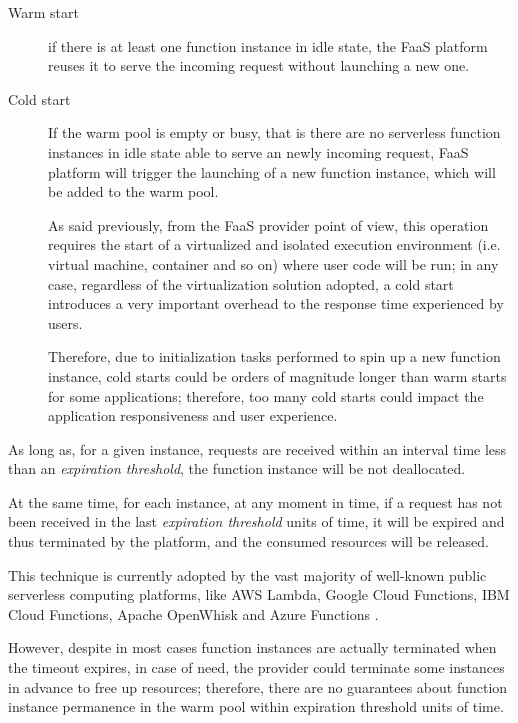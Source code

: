 \documentclass[12pt,a4paper]{report}
\begin{document}
\begin{description}
	
	\item[Warm start] if there is at least one function instance in idle state, the FaaS platform reuses it to serve the incoming request without launching a new one.
	
	\item[Cold start] If the warm pool is empty or busy, that is there are no serverless function instances in idle state able to serve an newly incoming request, FaaS platform will trigger the launching of a new function instance, which will be added to the warm pool.
	
	As said previously, from the FaaS provider point of view, this operation requires the start of a virtualized and isolated execution environment (i.e. virtual machine, container and so on) where user code will be run; in any case, regardless of the virtualization solution adopted, a cold start introduces a very important overhead to the response time experienced by users. 
	
	Therefore, due to initialization tasks performed to spin up a new function instance, cold starts could be orders of magnitude longer than warm starts for some applications; therefore, too many cold starts could impact the application responsiveness and user experience.
\end{description} 

As long as, for a given instance, requests are received within an interval time less than an \textit{expiration threshold}, the function instance will be not deallocated.

At the same time, for each instance, at any moment in time, if a request has not been received in the last \textit{expiration threshold} units of time, it will be expired and thus terminated by the platform, and the consumed resources will be released. 

This technique is currently adopted by the vast majority of well-known public serverless computing platforms, like AWS Lambda, Google Cloud Functions, IBM Cloud Functions, Apache OpenWhisk and Azure Functions \cite{PMSCP}. 

However, despite in most cases function instances are actually terminated when the timeout expires, in case of need, the provider could terminate some instances in advance to free up resources; therefore, there are no guarantees about function instance permanence in the warm pool within expiration threshold units of time.
\end{document}
